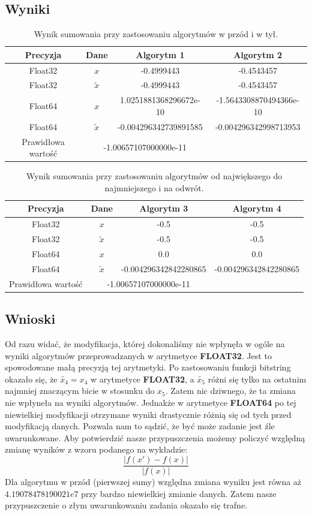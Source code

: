 \documentclass[]{article}
\begin{document}
\subsection{Wyniki}
\begin{table}[h]
	\centering
	\begin{tabular}{||c c c c||} 
		\hline
		Precyzja & Dane & Algorytm 1 & Algorytm 2\\ [0.5ex] 
		\hline\hline
		Float32 & $x$  & -0.4999443 &  -0.4543457\\ 
		Float32 & $\tilde{x}$ & -0.4999443 & -0.4543457\\
		Float64 & $x$ & 1.0251881368296672e-10 & -1.5643308870494366e-10\\
		Float64 & $\tilde{x}$ & -0.004296342739891585 &-0.004296342998713953\\
		\hline
		Prawidłowa wartość & \multicolumn{2}{c}{-1.00657107000000e-11}&\\
		\hline
	\end{tabular}
	\caption{Wynik sumowania przy zastosowaniu algorytmów w przód i w tył.}
\end{table}
\begin{table}[h]
	\centering
	\begin{tabular}{||c c c c||} 
		\hline
		Precyzja & Dane & Algorytm 3 & Algorytm 4 \\ [0.5ex] 
		\hline\hline
		Float32 & $x$ & -0.5 & -0.5\\ 
		Float32 & $\tilde{x}$ & -0.5 & -0.5\\
		Float64 & $x$ & 0.0 & 0.0\\
		Float64 & $\tilde{x}$ & -0.004296342842280865 & -0.004296342842280865\\
		\hline
		Prawidłowa wartość & \multicolumn{2}{c}{-1.00657107000000e-11}&\\
		\hline
	\end{tabular}
	\caption{Wynik sumowania przy zastosowaniu algorytmów od największego do najmniejszego i na odwrót.}
\end{table}
\subsection{Wnioski}
Od razu widać, że modyfikacja, której dokonaliśmy nie wpłynęła w ogóle na wyniki algorytmów przeprowadzanych w arytmetyce \textbf{FLOAT32}. Jest to spowodowane małą precyzją tej arytmetyki. Po zastosowaniu funkcji bitstring okazało się, że $\tilde{x_4} = x_4$ w arytmetyce \textbf{FLOAT32}, a $\tilde{x_5}$ różni się tylko na ostatnim najmniej znaczącym bicie w stosunku do $x_5$. Zatem nic dziwnego, że ta zmiana nie wpłyneła na wyniki algorytmów. Jednakże w arytmetyce \textbf{FLOAT64} po tej niewielkiej modyfikacji otrzymane wyniki drastycznie różnią się od tych przed modyfikacją danych. Pozwala nam to sądzić, że być może zadanie jest źle uwarunkowane. Aby potwierdzić nasze przypuszczenia możemy policzyć względną zmianę wyników z wzoru podanego na wykładzie:\[\frac{|f(x') - f(x)|}{|f(x)|} \]
Dla algorytmu w przód (pierwszej sumy) względna zmiana wyniku jest równa aż $4.19078478190021e7$ przy bardzo niewielkiej zmianie danych. Zatem nasze przypuszczenie o złym uwarunkowaniu zadania okazało się trafne.
\end{document}
